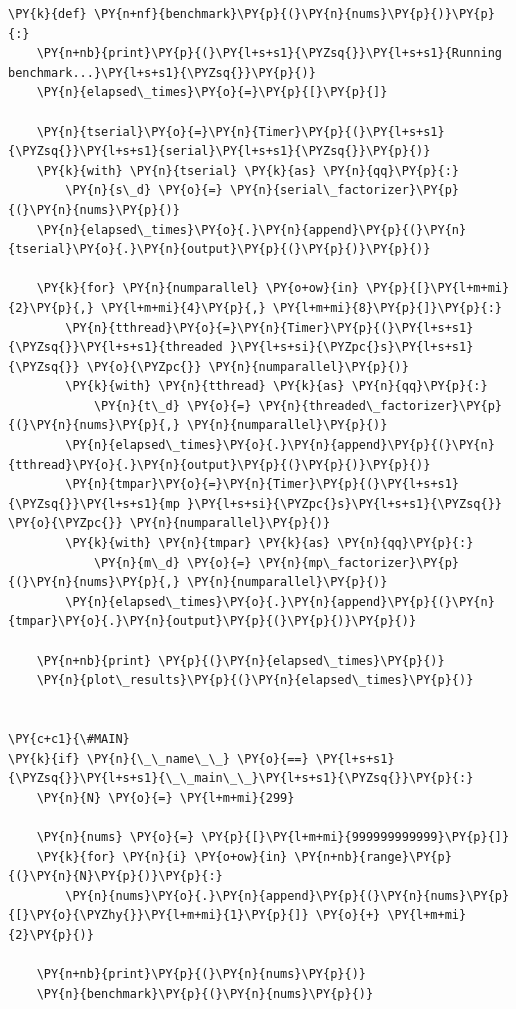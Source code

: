 \begin{Verbatim}[label=\makebox{\url{https://github.com/lucabaldini/cmepda/tree/master/slides/latex/snippets/benchmark_comparison.py}},commandchars=\\\{\}]
\PY{k}{def} \PY{n+nf}{benchmark}\PY{p}{(}\PY{n}{nums}\PY{p}{)}\PY{p}{:}
    \PY{n+nb}{print}\PY{p}{(}\PY{l+s+s1}{\PYZsq{}}\PY{l+s+s1}{Running benchmark...}\PY{l+s+s1}{\PYZsq{}}\PY{p}{)}
    \PY{n}{elapsed\_times}\PY{o}{=}\PY{p}{[}\PY{p}{]}

    \PY{n}{tserial}\PY{o}{=}\PY{n}{Timer}\PY{p}{(}\PY{l+s+s1}{\PYZsq{}}\PY{l+s+s1}{serial}\PY{l+s+s1}{\PYZsq{}}\PY{p}{)}
    \PY{k}{with} \PY{n}{tserial} \PY{k}{as} \PY{n}{qq}\PY{p}{:}
        \PY{n}{s\_d} \PY{o}{=} \PY{n}{serial\_factorizer}\PY{p}{(}\PY{n}{nums}\PY{p}{)}
    \PY{n}{elapsed\_times}\PY{o}{.}\PY{n}{append}\PY{p}{(}\PY{n}{tserial}\PY{o}{.}\PY{n}{output}\PY{p}{(}\PY{p}{)}\PY{p}{)}

    \PY{k}{for} \PY{n}{numparallel} \PY{o+ow}{in} \PY{p}{[}\PY{l+m+mi}{2}\PY{p}{,} \PY{l+m+mi}{4}\PY{p}{,} \PY{l+m+mi}{8}\PY{p}{]}\PY{p}{:}
        \PY{n}{tthread}\PY{o}{=}\PY{n}{Timer}\PY{p}{(}\PY{l+s+s1}{\PYZsq{}}\PY{l+s+s1}{threaded }\PY{l+s+si}{\PYZpc{}s}\PY{l+s+s1}{\PYZsq{}} \PY{o}{\PYZpc{}} \PY{n}{numparallel}\PY{p}{)}
        \PY{k}{with} \PY{n}{tthread} \PY{k}{as} \PY{n}{qq}\PY{p}{:}
            \PY{n}{t\_d} \PY{o}{=} \PY{n}{threaded\_factorizer}\PY{p}{(}\PY{n}{nums}\PY{p}{,} \PY{n}{numparallel}\PY{p}{)}
        \PY{n}{elapsed\_times}\PY{o}{.}\PY{n}{append}\PY{p}{(}\PY{n}{tthread}\PY{o}{.}\PY{n}{output}\PY{p}{(}\PY{p}{)}\PY{p}{)}
        \PY{n}{tmpar}\PY{o}{=}\PY{n}{Timer}\PY{p}{(}\PY{l+s+s1}{\PYZsq{}}\PY{l+s+s1}{mp }\PY{l+s+si}{\PYZpc{}s}\PY{l+s+s1}{\PYZsq{}} \PY{o}{\PYZpc{}} \PY{n}{numparallel}\PY{p}{)}
        \PY{k}{with} \PY{n}{tmpar} \PY{k}{as} \PY{n}{qq}\PY{p}{:}
            \PY{n}{m\_d} \PY{o}{=} \PY{n}{mp\_factorizer}\PY{p}{(}\PY{n}{nums}\PY{p}{,} \PY{n}{numparallel}\PY{p}{)}
        \PY{n}{elapsed\_times}\PY{o}{.}\PY{n}{append}\PY{p}{(}\PY{n}{tmpar}\PY{o}{.}\PY{n}{output}\PY{p}{(}\PY{p}{)}\PY{p}{)}

    \PY{n+nb}{print} \PY{p}{(}\PY{n}{elapsed\_times}\PY{p}{)}
    \PY{n}{plot\_results}\PY{p}{(}\PY{n}{elapsed\_times}\PY{p}{)}


\PY{c+c1}{\#MAIN}
\PY{k}{if} \PY{n}{\_\_name\_\_} \PY{o}{==} \PY{l+s+s1}{\PYZsq{}}\PY{l+s+s1}{\_\_main\_\_}\PY{l+s+s1}{\PYZsq{}}\PY{p}{:}
    \PY{n}{N} \PY{o}{=} \PY{l+m+mi}{299}

    \PY{n}{nums} \PY{o}{=} \PY{p}{[}\PY{l+m+mi}{999999999999}\PY{p}{]}
    \PY{k}{for} \PY{n}{i} \PY{o+ow}{in} \PY{n+nb}{range}\PY{p}{(}\PY{n}{N}\PY{p}{)}\PY{p}{:}
        \PY{n}{nums}\PY{o}{.}\PY{n}{append}\PY{p}{(}\PY{n}{nums}\PY{p}{[}\PY{o}{\PYZhy{}}\PY{l+m+mi}{1}\PY{p}{]} \PY{o}{+} \PY{l+m+mi}{2}\PY{p}{)}

    \PY{n+nb}{print}\PY{p}{(}\PY{n}{nums}\PY{p}{)}
    \PY{n}{benchmark}\PY{p}{(}\PY{n}{nums}\PY{p}{)}
\end{Verbatim}